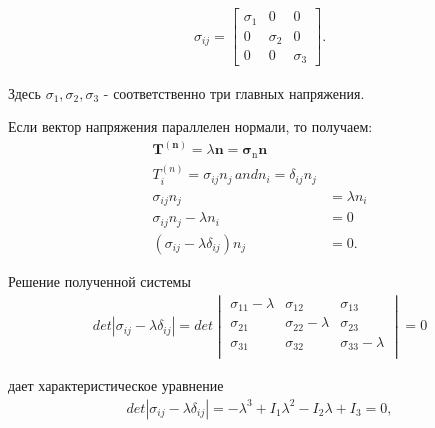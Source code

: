 \begin{eqnarray}
\sigma_{ij} = \begin{bmatrix} \sigma_1 & 0 & 0\\ 
0 & \sigma_2 & 0\\ 
0 & 0 & \sigma_3 \end{bmatrix}.
\end{eqnarray}

Здесь $\sigma_1, \sigma_2, \sigma_3$ - соответственно три главных напряжения.

Если вектор напряжения параллелен нормали, то получаем:
\begin{eqnarray}
\mathbf{T}^{(\mathbf{n})} = \lambda \mathbf{n}= \mathbf{\sigma}_\mathrm n \mathbf{n} \\
T_i^{(n)}=\sigma_{ij}n_j\,\! and n_i=\delta_{ij}n_j \\
\sigma_{ij}n_j &=\lambda n_i \\ 
\sigma_{ij}n_j -\lambda n_i &=0 \\ 
\left(\sigma_{ij}- \lambda\delta_{ij} \right)n_j &=0.
\end{eqnarray}

Решение полученной системы
\begin{eqnarray}
det|\sigma_{ij}- \lambda\delta_{ij}|=det \begin{vmatrix} \sigma_{11} - \lambda & \sigma_{12} & \sigma_{13} \\ \sigma_{21} & \sigma_{22} - \lambda & \sigma_{23} \\ \sigma_{31}& \sigma_{32} & \sigma_{33} - \lambda \\ \end{vmatrix}=0
\end{eqnarray}

дает характеристическое уравнение
\begin{eqnarray}
det|\sigma_{ij}- \lambda\delta_{ij}| = -\lambda^3 + I_1\lambda^2 - I_2\lambda + I_3=0,
\end{eqnarray}

